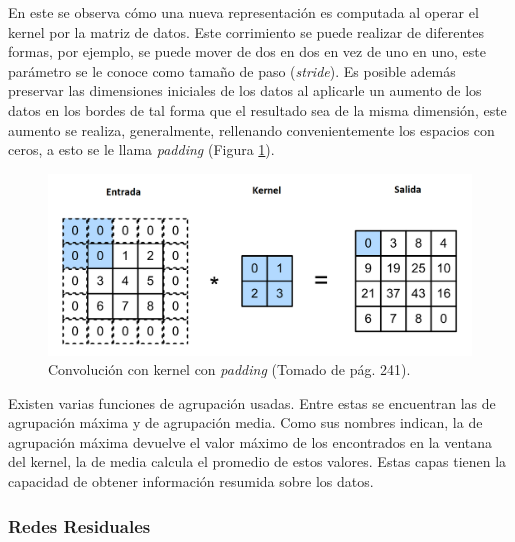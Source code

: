 En este se observa cómo una nueva representación es computada al operar el kernel por la matriz de datos. Este
corrimiento se puede realizar de diferentes formas, por ejemplo, se puede mover de dos en dos en vez de uno en uno, este
parámetro se le conoce como tamaño de paso (\emph{stride}). Es posible además preservar las dimensiones
iniciales de los datos al aplicarle un aumento de los datos en los bordes de tal forma que el resultado sea de la misma
dimensión, este aumento se realiza, generalmente, rellenando convenientemente los espacios con ceros, 
a esto se le llama \emph{padding} (Figura \ref{fig:conv_kernel_padding}).

\begin{figure}[h!]
	\begin{center}
		\begin{center}
			\includegraphics[scale=.4]{Graphics/kernel_convolution_padding.png}
        \end{center}
		\caption{Convolución con kernel con \emph{padding} (Tomado de \textcite{d2l} pág. 241).}\label{fig:conv_kernel_padding}
	\end{center}
\end{figure}

Existen varias funciones de agrupación usadas. Entre estas se encuentran las de agrupación máxima y de 
agrupación media. Como sus nombres indican, la de agrupación máxima devuelve el valor máximo de los encontrados
en la ventana del kernel, la de media calcula el promedio de estos valores. Estas capas tienen la capacidad de obtener
información resumida sobre los datos.

\subsubsection{Redes Residuales}

